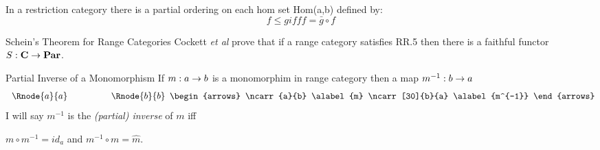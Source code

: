 \begin{frame}
In a restriction category there is a partial ordering on each hom set
Hom(a,b) defined by:
$$f \leq g iff f = \bar{g} \circ f$$
\end{frame}



\begin{frame}{Schein’s Theorem for Range Categories}
Cockett \textit{et al} prove that if a range category \catcw satisfies 
RR.5
then there is a faithful functor $S: \textbf{C} \rightarrow \textbf{Par}$. \\
\end{frame}

\begin{frame}{Partial Inverse of a Monomorphism}
If  $m:a \rightarrow b$ is a monomorphim in range category \catcw then
a map $m^{-1}: b \rightarrow a$ 
$$
\begin{array}{c p{1cm} c}
\Rnode{a}{a} && \Rnode{b}{b}
\end{array}
\begin{arrows}
\ncarr{a}{b}
\alabel{m}
\ncarr[30]{b}{a}
\alabel{m^{-1}}
\end{arrows}
$$
I will say $m^{-1}$ is the \textit{(partial) inverse} of $m$ iff
\begin{center}
$m \circ m^{-1}= id_a$
\hspace{0.75cm} and \hspace{0.75cm}
$m^{-1} \circ m= \widehat{m}.$
\end{center} 
\end{frame}
